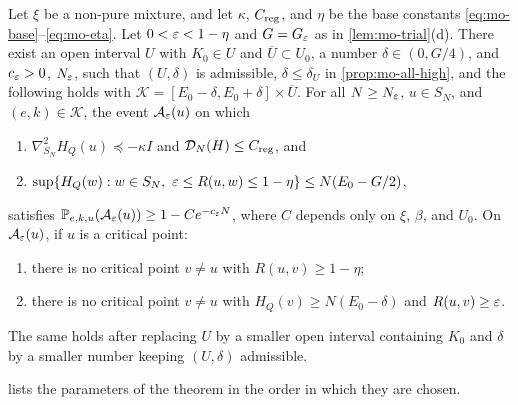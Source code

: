 \begin{theorem}\label{thm:mo-filter}
Let $\xi$ be a non-pure mixture, and let $\kappa$, $C_{\rm reg}$, and $\eta$ be the base constants \eqref{eq:mo-base}--\eqref{eq:mo-eta}. Let $0<\varepsilon<1-\eta$ and $G=G_\varepsilon$ as in \cref{lem:mo-trial}(d). There exist an open interval $U$ with $K_0\in U$ and $\overline U\subset U_0$, a number $\delta\in(0,G/4)$, and $c_\varepsilon>0$, $N_\varepsilon$, such that $(U,\delta)$ is admissible, $\delta\le\delta_U$ in \cref{prop:mo-all-high}, and the following holds with $\mathcal K=[E_0-\delta,E_0+\delta]\times\overline U$. For all $N\ge N_\varepsilon$, $u\in S_N$, and $(e,k)\in\mathcal K$, the event $\mathcal A_\varepsilon(u)$ on which
\begin{enumerate}
\item[(i)] $\nabla_{S_N}^2H_Q(u)\preceq-\kappa I$ and $\mathcal D_N(H)\le C_{\rm reg}$, and
\item[(ii)] $\sup\{H_Q(w):w\in S_N,\ \varepsilon\le R(u,w)\le1-\eta\}\le N(E_0-G/2)$,
\end{enumerate}
satisfies $\mathbb P_{e,k,u}(\mathcal A_\varepsilon(u))\ge1-Ce^{-c_\varepsilon N}$, where $C$ depends only on $\xi$, $\beta$, and $U_0$. On $\mathcal A_\varepsilon(u)$, if $u$ is a critical point:
\begin{enumerate}
\item[(iii)] there is no critical point $v\ne u$ with $R(u,v)\ge1-\eta$;
\item[(iv)] there is no critical point $v\ne u$ with $H_Q(v)\ge N(E_0-\delta)$ and $R(u,v)\ge\varepsilon$.
\end{enumerate}
The same holds after replacing $U$ by a smaller open interval containing $K_0$ and $\delta$ by a smaller number keeping $(U,\delta)$ admissible.
\end{theorem}

 lists the parameters of the theorem in the order in which they are chosen.

